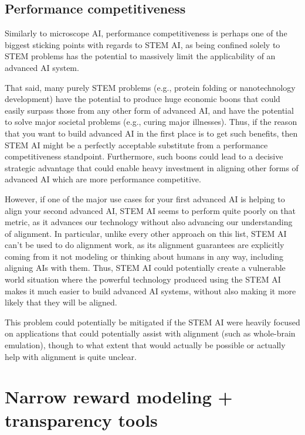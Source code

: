 \documentclass[
  onecolumn,
  natbib,
]{miri-tech-article}
\begin{document}
\subsection{Performance competitiveness} Similarly to microscope AI, performance competitiveness is perhaps one of the biggest sticking points with regards to STEM AI, as being confined solely to STEM problems has the potential to massively limit the applicability of an advanced AI system.

That said, many purely STEM problems (e.g., protein folding or nanotechnology development) have the potential to produce huge economic boons that could easily surpass those from any other form of advanced AI, and have the potential to solve major societal problems (e.g., curing major illnesses). Thus, if the reason that you want to build advanced AI in the first place is to get such benefits, then STEM AI might be a perfectly acceptable substitute from a performance competitiveness standpoint. Furthermore, such boons could lead to a decisive strategic advantage that could enable heavy investment in aligning other forms of advanced AI which are more performance competitive.

However, if one of the major use cases for your first advanced AI is helping to align your second advanced AI, STEM AI seems to perform quite poorly on that metric, as it advances our technology without also advancing our understanding of alignment. In particular, unlike every other approach on this list, STEM AI can't be used to do alignment work, as its alignment guarantees are explicitly coming from it not modeling or thinking about humans in any way, including aligning AIs with them. Thus, STEM AI could potentially create a vulnerable world situation\cite{vulnerable} where the powerful technology produced using the STEM AI makes it much easier to build advanced AI systems, without also making it more likely that they will be aligned.

This problem could potentially be mitigated if the STEM AI were heavily focused on applications that could potentially assist with alignment (such as whole-brain emulation),\cite{wbe} though to what extent that would actually be possible or actually help with alignment is quite unclear.

\section{Narrow reward modeling + transparency tools}
\label{sec:7}
\end{document}
